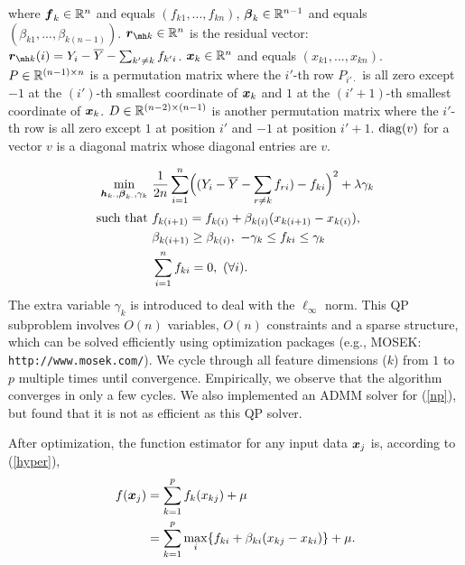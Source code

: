 where $\boldsymbol{f}_k \in {\mathbb R}^n$ and equals $(f_{k1}, ..., f_{kn})$, $\boldsymbol{\beta}_k \in {\mathbb R}^{n-1}$ and equals $(\beta_{k1}, ..., \beta_{k(n-1)})$. $\bds{r}_{\mh k} \in \R^n$ is the residual vector: $\bds{r}_{\mh k}(i) = Y_i - \bar{Y} - \sum_{k' \neq k} f_{k' i}$. $\boldsymbol{x}_k \in {\mathbb R}^n$ and equals $(x_{k1}, ..., x_{kn})$. \\

$P \in {\mathbb R}^{(n-1) \times n}$ is a permutation matrix where the $i'$-th row $P_{i' \cdot}$ is all zero except $-1$ at the $(i')$-th smallest coordinate of $\boldsymbol{x}_k$ and $1$ at the $(i'+1)$-th smallest coordinate of $\boldsymbol{x}_k$. $D \in {\mathbb R}^{(n-2) \times (n-1)}$ is another permutation matrix where the $i'$-th row is all zero except $1$ at position $i'$ and $-1$ at position $i'+1$. $\mathop{\rm diag}( v )$ for a vector $v$ is a diagonal matrix whose diagonal entries are $v$.

\begin{equation}
\label{eqn:opt_1d}
\begin{split}
       \min_{\boldsymbol{h}_{k\cdot},\boldsymbol{\beta}_{k\cdot},\gamma_{k}} &
             \ \frac{1}{2n}\sum_{i=1}^{n}\Bigl((Y_{i}-\overline{Y}
                -\sum_{r\neq{k}}f_{ri})-f_{ki}\Bigr)^{2} 
                      + \lambda\gamma_{k} \\
        \textrm{such that} & \ f_{k(i+1)} = f_{k(i)} + \beta_{k(i)}(x_{k(i+1)}-x_{k(i)}),\\
        &\ \beta_{k(i+1)} \geq \beta_{k(i)}, \ -\gamma_{k}\leq f_{ki}\leq\gamma_{k}\\
        &\  \sum_{i=1}^{n}f_{ki}=0, \ (\forall i).
\end{split}
\end{equation}
The extra variable $\gamma_{k}$ is introduced to deal with the $\ell_{\infty}$ norm. This QP subproblem involves $O(n)$ variables, $O(n)$ constraints and a sparse structure, 
which can be solved efficiently using optimization packages (e.g., MOSEK: \verb+http://www.mosek.com/+).  We cycle through all feature dimensions ($k$) from $1$ to $p$ multiple times until convergence.
Empirically, we observe that the algorithm converges in only a few cycles. We also implemented an ADMM solver for (\ref{np}), but found that it is not as efficient as this QP solver.

After optimization, the function estimator for any input data $\boldsymbol{x}_j$ is, according to (\ref{hyper}),
\begin{equation}
\begin{split}
\nonumber
      f(\boldsymbol{x}_j) & = \sum_{k=1}^{p}f_k(x_{kj})+\mu \\ 
    & = \sum_{k=1}^{p}\max_{i} \{f_{ki}+\beta_{ki}(x_{kj}-x_{ki})\} +
      \mu.
\end{split}
\end{equation} 


